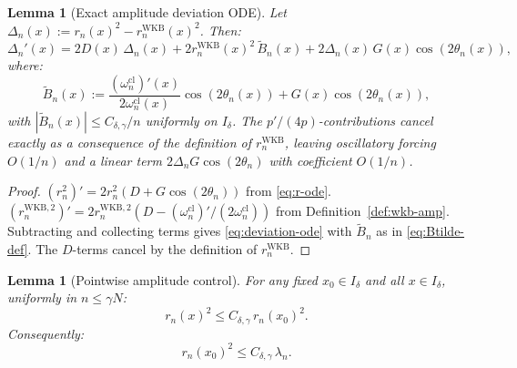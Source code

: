 \documentclass[12pt,a4paper]{amsart}
\newtheorem{lemma}[theorem]{Lemma}
\newcommand{\wncl}{\omega_n^{\mathrm{cl}}}
\begin{document}
\begin{lemma}[Exact amplitude deviation ODE]
\label{lem:deviation-ode}
Let $\Delta_n(x) := r_n(x)^2 - r_n^{\mathrm{WKB}}(x)^2$.
Then:
\begin{equation}\label{eq:deviation-ode}
  \Delta_n'(x)
  = 2D(x)\,\Delta_n(x)
    + 2r_n^{\mathrm{WKB}}(x)^2\,\widetilde{B}_n(x)
    + 2\Delta_n(x)\,G(x)\cos(2\theta_n(x)),
\end{equation}
where:
\begin{equation}\label{eq:Btilde-def}
  \widetilde{B}_n(x)
  := \frac{(\wncl)'(x)}{2\wncl(x)}\cos(2\theta_n(x))
     + G(x)\cos(2\theta_n(x)),
\end{equation}
with $|\widetilde{B}_n(x)| \le C_{\delta,\gamma}/n$
uniformly on $I_\delta$.
The $p'/(4p)$-contributions cancel exactly as a consequence
of the definition of $r_n^{\mathrm{WKB}}$,
leaving oscillatory forcing $O(1/n)$ and a linear term
$2\Delta_n G\cos(2\theta_n)$ with coefficient $O(1/n)$.
\end{lemma}

\begin{proof}
$(r_n^2)' = 2r_n^2(D + G\cos(2\theta_n))$
from \eqref{eq:r-ode}.
$(r_n^{\mathrm{WKB},2})' = 2r_n^{\mathrm{WKB},2}(D - (\wncl)'/(2\wncl))$
from Definition~\ref{def:wkb-amp}.
Subtracting and collecting terms gives \eqref{eq:deviation-ode}
with $\widetilde{B}_n$ as in \eqref{eq:Btilde-def}.
The $D$-terms cancel by the definition of $r_n^{\mathrm{WKB}}$.
\end{proof}

\begin{lemma}[Pointwise amplitude control]%
\label{lem:pointwise-control}
For any fixed $x_0 \in I_\delta$ and all $x \in I_\delta$,
uniformly in $n \le \gamma N$:
\begin{equation}\label{eq:amp-comp}
  r_n(x)^2 \le C_{\delta,\gamma}\,r_n(x_0)^2.
\end{equation}
Consequently:
\begin{equation}\label{eq:pointwise-lambda}
  r_n(x_0)^2 \le C_{\delta,\gamma}\,\lambda_n.
\end{equation}
\end{lemma}
\end{document}
